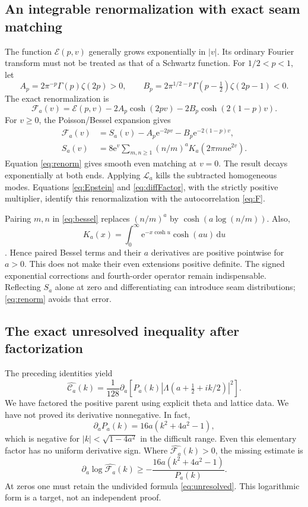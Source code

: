 \documentclass[11pt,letterpaper]{article}
\numberwithin{equation}{section}
\theoremstyle{remark}\newtheorem{remark}[proposition]{Remark}
\newcommand{\dd}{\,\mathrm d}
\newcommand{\calC}{\mathcal C}
\newcommand{\calF}{\mathcal F}
\newcommand{\calE}{\mathcal E}
\newcommand{\ee}{\mathrm e}
\begin{document}
\subsection{An integrable renormalization with exact seam matching}
The function $\calE(p,v)$ generally grows exponentially in $|v|$. Its ordinary Fourier transform must not be treated as that of a Schwartz function. For $1/2<p<1$, let
\[
 A_p=2\pi^{-p}\Gamma(p)\zeta(2p)>0,\qquad
 B_p=2\pi^{1/2-p}\Gamma(p-\tfrac12)\zeta(2p-1)<0.
\]
The exact renormalization is
\begin{equation}\label{eq:renorm}
 \calF_a(v)=\calE(p,v)
       -2A_p\cosh(2pv)-2B_p\cosh(2(1-p)v).
\end{equation}
For $v\ge0$, the Poisson/Bessel expansion gives
\begin{align}
 \calF_a(v)&=S_a(v)-A_p\ee^{-2pv}
                         -B_p\ee^{-2(1-p)v},\\
 S_a(v)&=8\ee^v\sum_{m,n\ge1}(n/m)^a
                 K_a(2\pi mn\ee^{2v}).\label{eq:bessel}
\end{align}
Equation \eqref{eq:renorm} gives smooth even matching at $v=0$. The result decays exponentially at both ends. Applying $\mathcal L_a$ kills the subtracted homogeneous modes. Equations \eqref{eq:Epstein} and \eqref{eq:diffFactor}, with the strictly positive multiplier, identify this renormalization with the autocorrelation \eqref{eq:F}.

Pairing $m,n$ in \eqref{eq:bessel} replaces $(n/m)^a$ by
$\cosh(a\log(n/m))$. Also,
\[
 K_a(x)=\int_0^\infty\ee^{-x\cosh u}\cosh(au)\dd u
\]
\cite{dlmfBessel}. Hence paired Bessel terms and their $a$ derivatives are positive pointwise for $a>0$. This does not make their even extensions positive definite. The signed exponential corrections and fourth-order operator remain indispensable. Reflecting $S_a$ alone at zero and differentiating can introduce seam distributions; \eqref{eq:renorm} avoids that error.

\subsection{The exact unresolved inequality after factorization}
The preceding identities yield
\begin{equation}\label{eq:unresolved}
 \boxed{\widehat{\calC_a}(k)=
 \frac1{128}\partial_a
 \left[P_a(k)|\Lambda(a+\tfrac12+ik/2)|^2\right].}
\end{equation}
We have factored the positive parent using explicit theta and lattice data. We have not proved its derivative nonnegative. In fact,
\[
 \partial_aP_a(k)=16a(k^2+4a^2-1),
\]
which is negative for $|k|<\sqrt{1-4a^2}$ in the difficult range. Even this elementary factor has no uniform derivative sign. Where $\widehat{\calF_a}(k)>0$, the missing estimate is
\begin{equation}
 \partial_a\log\widehat{\calF_a}(k)
 \ge-\frac{16a(k^2+4a^2-1)}{P_a(k)}.
\end{equation}
At zeros one must retain the undivided formula \eqref{eq:unresolved}. This logarithmic form is a target, not an independent proof.
\end{document}
